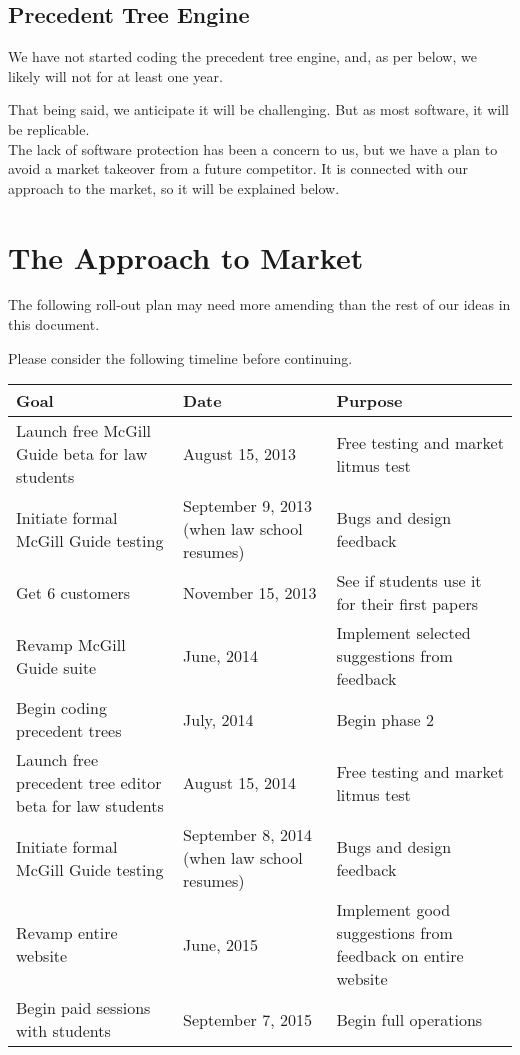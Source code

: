 \documentclass[11pt]{article}
\begin{document}
\subsection*{Precedent Tree Engine}

We have not started coding the precedent tree engine, and, as per below, we likely will not for at least one year.

That being said, we anticipate it will be challenging. But as most software, it will be replicable. \\

The lack of software protection has been a concern to us, but we have a plan to avoid a market takeover from a future competitor. It is connected with our approach to the market, so it will be explained below.

\section*{The Approach to Market}

The following roll-out plan may need more amending than the rest of our ideas in this document.

Please consider the following timeline before continuing.

\begin{table}[htdp]
\begin{center}
\begin{tabular}{ L{3cm} | L{3cm} | L{3cm} }
\textbf{Goal} & \textbf{Date}& \textbf{Purpose}\\
\hline
\hline
Launch free McGill Guide beta for law students & August 15, 2013 & Free testing and market litmus test\\
\hline
Initiate formal McGill Guide testing & September 9, 2013 (when law school resumes) & Bugs and design feedback \\
\hline
Get 6 customers & November 15, 2013 & See if students use it for their first papers\\
\hline
Revamp McGill Guide suite & June, 2014 & Implement selected suggestions from feedback\\
\hline
Begin coding precedent trees & July, 2014 & Begin phase 2\\
\hline 
Launch free precedent tree editor beta for law students & August 15, 2014 & Free testing and market litmus test\\
\hline
Initiate formal McGill Guide testing & September 8, 2014 (when law school resumes) & Bugs and design feedback \\
\hline
Revamp entire website & June, 2015 & Implement good suggestions from feedback on entire website\\
\hline
Begin paid sessions with students & September 7, 2015 & Begin full operations\\
\end{tabular}
\end{center}
\label{Timeline}
\end{table}%
\end{document}

